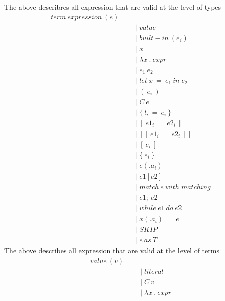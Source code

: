 \documentclass[10pt,a4paper]{article}
\begin{document}
The above describres all expression that are valid at the level of types
\newpage
\begin{align*}
term\ expression\ (e)\ = 
\\
 \ &|\ value                           \ \tag{values}
\\
 \ &|\ built-in\ (e_i)                  \ \tag{built-in\ function}
\\
 \ &|\ x                               \ \tag{variables}
\\
 \ &|\ \lambda x\ .\ expr                       \ \tag{lambda\ absctraction}
\\
 \ &|\ e_1\ e_2                         \ \tag{application}
\\
 \ &|\ let\ x\ =\ e_1\ in\ e_2              \ \tag{let\ in}
\\
 \ &|\ (\ e_i\ )                         \ \tag{tuple}
\\
 \ &|\ C\ e                             \ \tag{constructor}
\\
 \ &|\ \{\ l_i\ =\ e_i\ \}                   \ \tag{record}
\\
 \ &|\ [\ e1_i\ =\ e2_i\ ]                 \ \tag{map}
\\
 \ &|\ [[\ e1_i\ =\ e2_i\ ]]               \ \tag{big\ map}
\\
 \ &|\ [\ e_i\ ]                         \ \tag{list}
\\
 \ &|\ \{\ e_i\ \}                         \ \tag{set}
\\
 \ &|\ e(.a_i)                         \ \tag{accessor}
\\
 \ &|\ e1[e2]                          \ \tag{look\ up}
\\
 \ &|\ match\ e\ with\ matching           \ \tag{matching}
\\
 \ &|\ e1;\ e2                          \ \tag{sequence}
\\
 \ &|\ while\ e1\ do\ e2                  \ \tag{loop}
\\
 \ &|\ x(.a_i)\ =\ e                     \ \tag{assign}
\\
 \ &|\ SKIP                            \ \tag{skip}
\\
 \ &|\ e\ as\ T                          \ \tag{ascription}
\end{align*}
The above describes all expression that are valid at the level of terms
\begin{align*}
value\ (v)\ = 
\\
 \ &|\ literal                         \ \tag{values\ of\ built-in\ types}
\\
 \ &|\ C\ v                             \ \tag{values\ of\ construct\ types}
\\
 \ &|\ \lambda x\ .\ expr                       \ \tag{lambda\ abstraction}
\end{align*}
\end{document}
